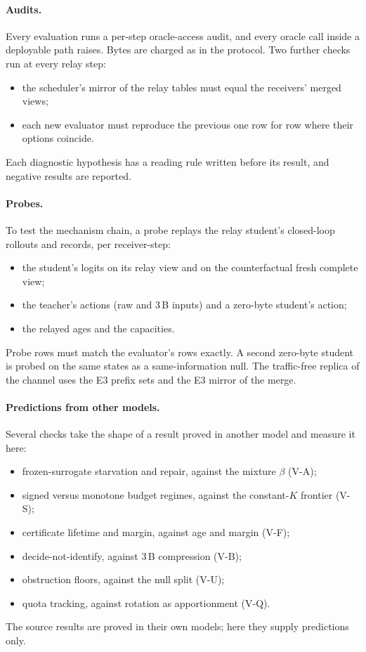 \documentclass[11pt]{article}
\theoremstyle{definition}
\begin{document}
\paragraph{Audits.} Every evaluation runs a per-step oracle-access audit, and every oracle call inside a deployable path
raises. Bytes are charged as in the protocol. Two further checks run at every relay step:
\begin{itemize}
\item the scheduler's mirror of the relay tables must equal the receivers' merged views;
\item each new evaluator must reproduce the previous one row for row where their options coincide.
\end{itemize}
Each diagnostic hypothesis has a reading rule written before its result, and negative results are reported.
\paragraph{Probes.} To test the mechanism chain, a probe replays the relay student's closed-loop rollouts and records, per
receiver-step:
\begin{itemize}
\item the student's logits on its relay view and on the counterfactual fresh complete view;
\item the teacher's actions (raw and 3\,B inputs) and a zero-byte student's action;
\item the relayed ages and the capacities.
\end{itemize}
Probe rows must match the evaluator's rows exactly. A second zero-byte student is probed on the same states as a
same-information null. The traffic-free replica of the channel uses the E3 prefix sets and the E3 mirror of the merge.
\paragraph{Predictions from other models.} Several checks take the shape of a result proved in another model and measure
it here:
\begin{itemize}
\item frozen-surrogate starvation and repair, against the mixture $\beta$ (V-A);
\item signed versus monotone budget regimes, against the constant-$K$ frontier (V-S);
\item certificate lifetime and margin, against age and margin (V-F);
\item decide-not-identify, against 3\,B compression (V-B);
\item obstruction floors, against the null split (V-U);
\item quota tracking, against rotation as apportionment (V-Q).
\end{itemize}
The source results are proved in their own models; here they supply predictions only.
\end{document}
